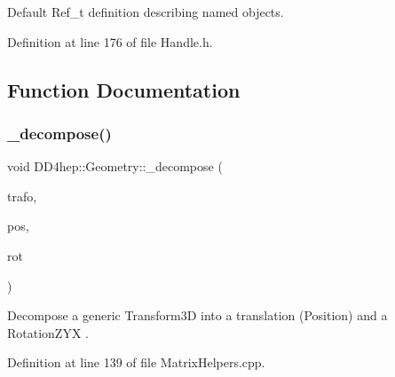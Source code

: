 Default Ref\+\_\+t definition describing named objects. 



Definition at line 176 of file Handle.\+h.



\subsection{Function Documentation}
\hypertarget{group___d_d4_h_e_p___g_e_o_m_e_t_r_y_ga9bb962c6fc39a0f8fc76420e08d24c7a}{}\label{group___d_d4_h_e_p___g_e_o_m_e_t_r_y_ga9bb962c6fc39a0f8fc76420e08d24c7a} 
\subsubsection{\texorpdfstring{\+\_\+decompose()}{\_decompose()}\hspace{0.1cm}{\footnotesize\ttfamily [1/4]}}
{\footnotesize\ttfamily void D\+D4hep\+::\+Geometry\+::\+\_\+decompose (\begin{DoxyParamCaption}\item[{const \hyperlink{namespace_d_d4hep_1_1_geometry_aeb4c0356d12fd7be49a0aae50514e64b}{Geometry\+::\+Transform3D} \&}]{trafo,  }\item[{\hyperlink{namespace_d_d4hep_1_1_geometry_a55083902099d03506c6db01b80404900}{Geometry\+::\+Position} \&}]{pos,  }\item[{\hyperlink{namespace_d_d4hep_1_1_geometry_a24667b2b9c3cec3d5239828db4d52189}{Geometry\+::\+Rotation\+Z\+YX} \&}]{rot }\end{DoxyParamCaption})}



Decompose a generic Transform3D into a translation (Position) and a Rotation\+Z\+YX . 



Definition at line 139 of file Matrix\+Helpers.\+cpp.

\hypertarget{group___d_d4_h_e_p___g_e_o_m_e_t_r_y_gad0cc5511671f40c3394c8688e7a2316f}{}\label{group___d_d4_h_e_p___g_e_o_m_e_t_r_y_gad0cc5511671f40c3394c8688e7a2316f} 
